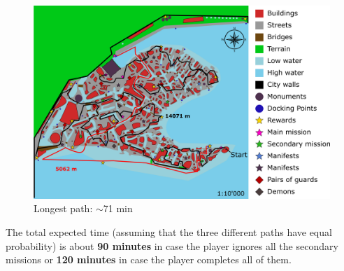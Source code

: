 \begin{figure}[H]
    \centering
	\includegraphics[width=\textwidth]{Images/Diagrams/dynamiapath3.png}
	\caption{Longest path: $\sim$71 min}
\end{figure}

The total expected time (assuming that the three different paths have equal probability) is about \textbf{90 minutes} in case the player ignores all the secondary missions or \textbf{120 minutes} in case the player completes all of them.
